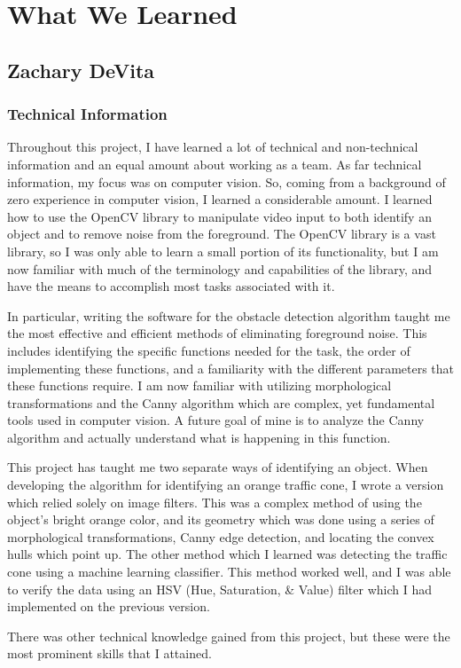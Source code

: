 \documentclass[10pt,letterpaper,onecolumn,draftclsnofoot,journal]{IEEEtran}
\begin{document}
\section{\textbf{What We Learned}}

\subsection{\textbf{Zachary DeVita}}
\subsubsection{\textbf{Technical Information}}
Throughout this project, I have learned a lot of technical and non-technical information and an equal amount about working as a team.
As far technical information, my focus was on computer vision. So, coming from a background of zero experience in computer vision, I learned a considerable amount. I learned how to use the OpenCV library to manipulate video input to both identify an object and to remove noise from the foreground. The OpenCV library is a vast library, so I was only able to learn a small portion of its functionality, but I am now familiar with much of the terminology and capabilities of the library, and have the means to accomplish most tasks associated with it.\vspace{.3cm}
\par 
In particular, writing the software for the obstacle detection algorithm taught me the most effective and efficient methods of eliminating foreground noise. This includes identifying the specific functions needed for the task, the order of implementing these functions, and a familiarity with the different parameters that these functions require. I am now familiar with utilizing morphological transformations and the Canny algorithm which are complex, yet fundamental tools used in computer vision. A future goal of mine is to analyze the Canny algorithm and actually understand what is happening in this function.\vspace{.3cm}
\par
This project has taught me two separate ways of identifying an object. When developing the algorithm for identifying an orange traffic cone, I wrote a version which relied solely on image filters. This was a complex method of using the object's bright orange color, and its geometry which was done using a series of morphological transformations, Canny edge detection, and locating the convex hulls which point up. The other method which I learned was detecting the traffic cone using a machine learning classifier. This method worked well, and I was able to verify the data using an HSV (Hue, Saturation, \& Value) filter which I had implemented on the previous version.\vspace{.3cm}
\par 
There was other technical knowledge gained from this project, but these were the most prominent skills that I attained.
\end{document}
